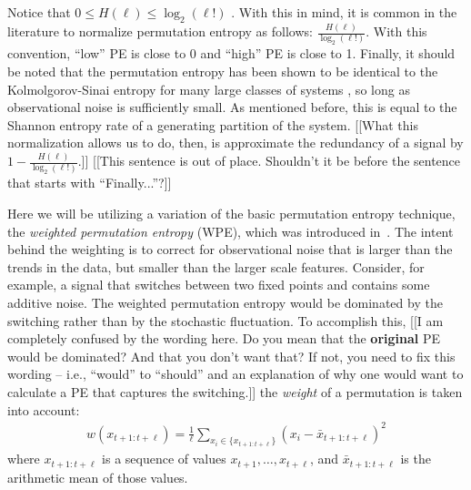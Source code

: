 Notice that $0\le H(\ell) \le \log_2(\ell!)$ \cite{bandt2002per}.
With this in mind, it is common in the literature to normalize
permutation entropy as follows: $\frac{H(\ell)}{\log_2(\ell!)}$.  With
this convention, ``low'' PE is close to 0 and ``high'' PE is close to
1. Finally, it should be noted that the permutation entropy has been
shown to be identical to the Kolmolgorov-Sinai entropy for many large
classes of systems \cite{amigo2012permutation}, so long as
observational noise is sufficiently small. As mentioned before, this
is equal to the Shannon entropy rate of a generating partition of the
system.  {\color{red} [[What this normalization allows us to do, then,
      is approximate the redundancy of a signal by $1 -
      \frac{H(\ell)}{\log_2(\ell!)}$.]] [[This sentence is out of
      place.  Shouldn't it be before the sentence that starts with
      ``Finally...''?]]}

Here we will be utilizing a variation of the basic permutation entropy
technique, the \emph{weighted permutation entropy} (WPE), which was
introduced in~\cite{fadlallah2013}.  The intent behind the weighting
is to correct for observational noise that is larger than the trends
in the data, but smaller than the larger scale features.  Consider,
for example, a signal that switches between two fixed points and
contains some additive noise.  {\color{red} The weighted permutation
  entropy would be dominated by the switching rather than by the
  stochastic fluctuation. To accomplish this, [[I am completely
      confused by the wording here.  Do you mean that the {\bf
        original} PE would be dominated?  And that you don't want
      that?  If not, you need to fix this wording -- i.e., ``would''
      to ``should'' and an explanation of why one would want to
      calculate a PE that captures the switching.]]} the \emph{weight}
of a permutation is taken into account:
\begin{align*}
  w(x_{t+1:t+\ell}) = \frac{1}{\ell} \sum_{x_i \in \{x_{t+1:t+\ell}\}}
                      \left( x_i - \bar{x}_{t+1:t+\ell} \right)^2
\end{align*}
where $x_{t+1:t+\ell}$ is a sequence of values $x_{t+1}, \ldots,
x_{t+\ell}$, and $\bar{x}_{t+1:t+\ell}$ is the arithmetic mean of
those values.

